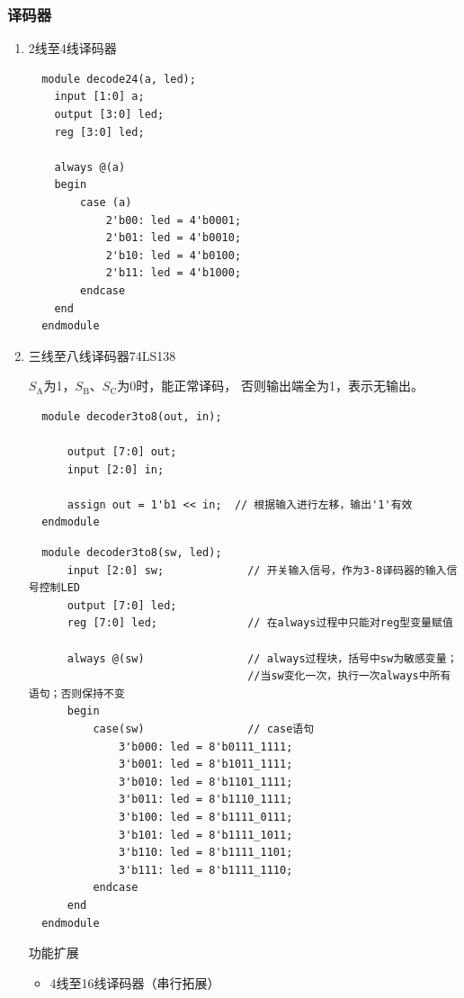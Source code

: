 \documentclass[UTF8,fontset=fandol,zihao=5]{ctexart}
\begin{document}
\subsubsection{译码器}

\begin{enumerate}
  \item 2线至4线译码器
  \begin{verbatim}
  module decode24(a, led);
    input [1:0] a;
    output [3:0] led;
    reg [3:0] led;

    always @(a)
    begin
        case (a)
            2'b00: led = 4'b0001;
            2'b01: led = 4'b0010;
            2'b10: led = 4'b0100;
            2'b11: led = 4'b1000;
        endcase
    end
  endmodule
  \end{verbatim}
  \item 三线至八线译码器74LS138
  
  $S_\mathrm{A}$为1，$S_\mathrm{B}$、$S_\mathrm{C}$为0时，能正常译码，
  否则输出端全为1，表示无输出。

  \begin{verbatim}
  module decoder3to8(out, in);

      output [7:0] out;
      input [2:0] in;

      assign out = 1'b1 << in;  // 根据输入进行左移，输出'1'有效
  endmodule
  \end{verbatim}
  \begin{verbatim}
  module decoder3to8(sw, led);
      input [2:0] sw;             // 开关输入信号，作为3-8译码器的输入信号控制LED
      output [7:0] led;
      reg [7:0] led;              // 在always过程中只能对reg型变量赋值

      always @(sw)                // always过程块，括号中sw为敏感变量；
                                  //当sw变化一次，执行一次always中所有语句；否则保持不变
      begin
          case(sw)                // case语句
              3'b000: led = 8'b0111_1111;
              3'b001: led = 8'b1011_1111;
              3'b010: led = 8'b1101_1111;
              3'b011: led = 8'b1110_1111;
              3'b100: led = 8'b1111_0111;
              3'b101: led = 8'b1111_1011;
              3'b110: led = 8'b1111_1101;
              3'b111: led = 8'b1111_1110;
          endcase
      end
  endmodule
  \end{verbatim}

  功能扩展
  \begin{itemize}
    \item 4线至16线译码器（串行拓展）
    

\end{itemize}
\end{enumerate}
\end{document}
